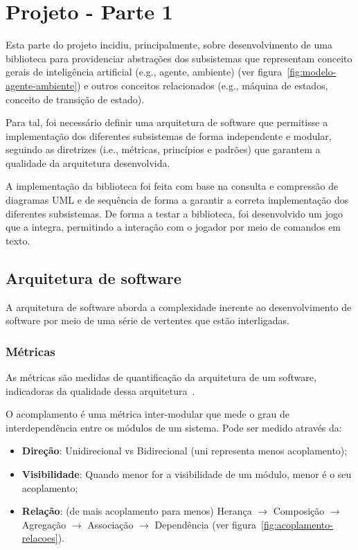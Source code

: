 \chapter{Projeto - Parte 1} \label{ch:projeto-parte1}

Esta parte do projeto incidiu, principalmente, sobre desenvolvimento de uma biblioteca para providenciar abstrações dos subsistemas que representam conceito gerais de inteligência artificial (e.g., agente, ambiente) (ver figura~\ref{fig:modelo-agente-ambiente}) e outros conceitos relacionados (e.g., máquina de estados, conceito de transição de estado).

Para tal, foi necessário definir uma arquitetura de software que permitisse a implementação dos diferentes subsistemas de forma independente e modular, seguindo as diretrizes (i.e., métricas, princípios e padrões) que garantem a qualidade da arquitetura desenvolvida.

A implementação da biblioteca foi feita com base na consulta e compressão de diagramas UML e de sequência de forma a garantir a correta implementação dos diferentes subsistemas.
De forma a testar a biblioteca, foi desenvolvido um jogo que a integra, permitindo a interação com o jogador por meio de comandos em texto.


\section{Arquitetura de software}\label{sec:arquitetura-de-software}

A arquitetura de software aborda a complexidade inerente ao desenvolvimento de software por meio de uma série de vertentes que estão interligadas.

\subsection{Métricas}\label{subsec:metricas}

As métricas são medidas de quantificação da arquitetura de um software, indicadoras da qualidade dessa arquitetura~\cite{isel:iasa:slides:intro-eng-soft-parte-2}.

O acomplamento é uma métrica inter-modular que mede o grau de interdependência entre os módulos de um sistema. Pode ser medido através da:
\begin{itemize}
    \item \textbf{Direção}: Unidirecional vs Bidirecional (uni representa menos acoplamento);
    \item \textbf{Visibilidade}: Quando menor for a visibilidade de um módulo, menor é o seu acoplamento;
    \item \textbf{Relação}: (de mais acoplamento para menos) Herança $\rightarrow$ Composição $\rightarrow$ Agregação $\rightarrow$ Associação $\rightarrow$ Dependência (ver figura~\ref{fig:acoplamento-relacoes}).
\end{itemize}

